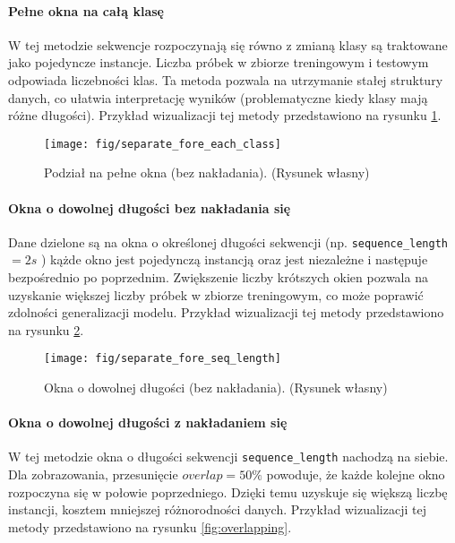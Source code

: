 \documentclass[eeg_v4.tex]{subfiles}
\begin{document}
    \paragraph{Pełne okna na całą klasę}
    W tej metodzie sekwencje rozpoczynają się równo z zmianą klasy są traktowane jako pojedyncze instancje. Liczba próbek w
    zbiorze treningowym i testowym odpowiada liczebności klas. Ta metoda pozwala na utrzymanie
    stałej struktury danych, co ułatwia interpretację wyników (problematyczne kiedy klasy mają różne długości). Przykład wizualizacji tej metody przedstawiono na rysunku
    \ref{fig:full_windows}.

    \begin{figure}[h!]
        \centering
        \texttt{[image: fig/separate\_fore\_each\_class]}
        \caption{Podział na pełne okna (bez nakładania). (Rysunek własny)}
        \label{fig:full_windows}
    \end{figure}

    \paragraph{Okna o dowolnej długości bez nakładania się}
    Dane dzielone są na okna o określonej długości sekwencji (np. \texttt{sequence\_length} $=2 s$ ) kążde okno jest pojedynczą instancją
    oraz jest niezależne i następuje bezpośrednio po poprzednim. Zwiększenie liczby krótszych okien pozwala na
    uzyskanie większej liczby próbek w zbiorze treningowym, co może poprawić zdolności generalizacji modelu. Przykład
    wizualizacji tej metody przedstawiono na rysunku \ref{fig:non_overlapping}.

    \begin{figure}[h!]
        \centering
        \texttt{[image: fig/separate\_fore\_seq\_length]}
        \caption{Okna o dowolnej długości (bez nakładania). (Rysunek własny)}
        \label{fig:non_overlapping}
    \end{figure}

    \paragraph{Okna o dowolnej długości z nakładaniem się}
    W tej metodzie okna o długości sekwencji \texttt{sequence\_length}
    nachodzą na siebie. Dla zobrazowania, przesunięcie
    $overlap = 50\%$
    powoduje, że każde kolejne okno rozpoczyna się w połowie poprzedniego. Dzięki temu uzyskuje się większą
    liczbę instancji, kosztem mniejszej różnorodności danych. Przykład
    wizualizacji tej metody przedstawiono na rysunku \ref{fig:overlapping}.
\end{document}
